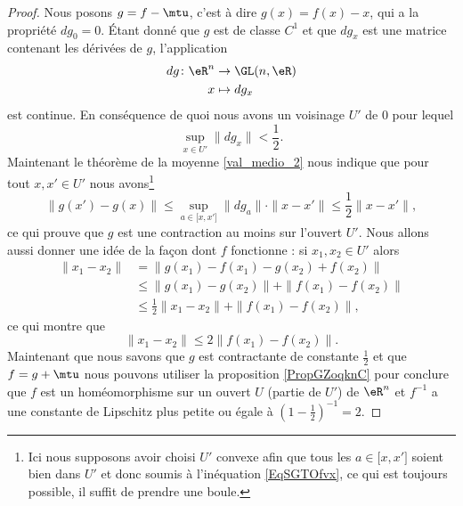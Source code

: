 \begin{proof}
    Nous posons \( g=f-\mtu\), c'est à dire \( g(x)=f(x)-x\), qui a la propriété \( dg_0=0\). Étant donné que \( g\) est de classe \( C^1\) et que \( dg_x\) est une matrice contenant les dérivées de \( g\), l'application
    \begin{equation}
        \begin{aligned}
            dg\colon \eR^n&\to \GL(n,\eR) \\
            x&\mapsto dg_x 
        \end{aligned}
    \end{equation}
    est continue. En conséquence de quoi nous avons un voisinage \( U'\) de \( 0 \) pour lequel
    \begin{equation}    \label{EqSGTOfvx}
        \sup_{x\in U'}\| dg_x \|<\frac{ 1 }{2}.
    \end{equation}
    Maintenant le théorème de la moyenne \ref{val_medio_2} nous indique que pour tout \( x,x'\in U'\) nous avons\footnote{Ici nous supposons avoir choisi \( U'\) convexe afin que tous les \( a\in \mathopen[ x , x' \mathclose]\) soient bien dans \( U'\) et donc soumis à l'inéquation \eqref{EqSGTOfvx}, ce qui est toujours possible, il suffit de prendre une boule.}
    \begin{equation}
        \| g(x')-g(x) \|\leq \sup_{a\in\mathopen[ x , x' \mathclose]}\| dg_a \| \cdot \| x-x' \|\leq \frac{ 1 }{2}\| x-x' \|,
    \end{equation}
    ce qui prouve que \( g\) est une contraction au moins sur l'ouvert \( U'\). Nous allons aussi donner une idée de la façon dont \( f\) fonctionne : si \( x_1,x_2\in U'\) alors
    \begin{subequations}
        \begin{align}
            \| x_1-x_2 \|&=\| g(x_1)-f(x_1)-g(x_2)+f(x_2) \| \\
            &\leq \| g(x_1)-g(x_2) \|+\| f(x_1)-f(x_2) \|\\
            &\leq \frac{ 1 }{2}\| x_1-x_2 \|+\| f(x_1)-f(x_2) \|,
        \end{align}
    \end{subequations}
    ce qui montre que
    \begin{equation}
        \| x_1-x_2 \|\leq 2\| f(x_1)-f(x_2) \|.
    \end{equation}
    Maintenant que nous savons que \( g\) est contractante de constante \( \frac{ 1 }{2}\) et que \( f=g+\mtu\) nous pouvons utiliser la proposition \ref{PropGZoqknC} pour conclure que \( f\) est un homéomorphisme sur un ouvert \( U\) (partie de \( U'\)) de \( \eR^n\) et \( f^{-1}\) a une constante de Lipschitz plus petite ou égale à \( (1-\frac{ 1 }{2})^{-1}=2\).


\end{proof}
